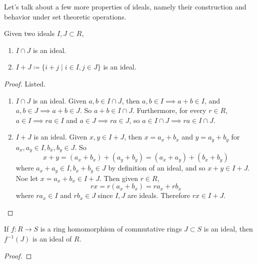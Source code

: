   Let's talk about a few more properties of ideals, namely their construction and behavior under set theoretic operations. 

  \begin{theorem} 
    \label{thm:sum_int_ideals}
    Given two ideals $I, J \subset R$, 
    \begin{enumerate}
      \item $I \cap J$ is an ideal. 
      \item $I + J \coloneqq \{i + j \mid i \in I, j \in J\}$ is an ideal. 
    \end{enumerate}
  \end{theorem}
  \begin{proof}
    Listed. 
    \begin{enumerate}
      \item $I \cap J$ is an ideal. Given $a, b \in I \cap J$, then $a, b \in I \implies a + b \in I$, and $a, b \in J \implies a + b \in J$. So $a + b \in I \cap J$. Furthermore, for every $r \in R$, $a \in I \implies r a \in I$ and $a \in J \implies r a \in J$, so $a \in I \cap J \implies ra \in I \cap J$. 

      \item $I + J$ is an ideal. Given $x, y \in I + J$, then $x = a_x + b_x$ and $y = a_y + b_y$ for $a_x, a_y \in I, b_x, b_y \in J$. So 
      \begin{equation}
        x + y = (a_x + b_x) + (a_y + b_y) = (a_x + a_y) + (b_x + b_y)
      \end{equation}
      where $a_x + a_y \in I, b_x + b_y \in J$ by definition of an ideal, and so $x + y \in I + J$. Noe let $x = a_x + b_x \in I + J$. Then given $r \in R$,
      \begin{equation}
        rx = r(a_x + b_x) = r a_x + r b_x
      \end{equation}
      where $r a_x \in I$ and $r b_x \in J$ since $I, J$ are ideals. Therefore $rx \in I + J$.  
    \end{enumerate}
  \end{proof}
  
  \begin{theorem}
    If $f: R \to S$ is a ring homomorphism of commutative rings $J \subset S$ is an ideal, then $f^{-1} (J)$ is an ideal of $R$. 
  \end{theorem}
  \begin{proof}
    
  \end{proof}

